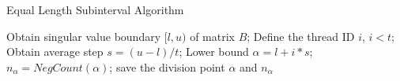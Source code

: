 \begin{algorithm}
\caption{Equal Length Subinterval Algorithm}
\label{alg:lengthsub}
\begin{algorithmic}[1]
  \State Obtain singular value boundary $[l,u)$ of matrix $B$;
  \State Define the thread ID $i$, $i<t$;
  \State Obtain average step $s = (u-l) / t $;
  \State Lower bound $\alpha = l + i * s$;
  \State $n_{\alpha} = NegCount(\alpha)$;
  \State save the division point $\alpha$ and $n_{\alpha}$
\EndProcedure
\end{algorithmic}
\end{algorithm}
